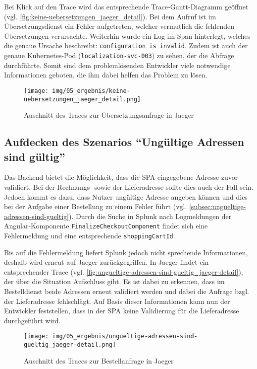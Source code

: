 Bei Klick auf den Trace wird das entsprechende Trace-Gantt-Diagramm geöffnet (vgl. \autoref{fig:keine-uebersetzungen_jaeger_detail}). Bei dem Aufruf ist im Übersetzungsdienst ein Fehler aufgetreten, welcher vermutlich die fehlenden Übersetzungen verursachte. Weiterhin wurde ein Log im Span hinterlegt, welches die genaue Ursache beschreibt: \texttt{configuration is invalid}. Zudem ist auch der genaue Kubernetes-Pod (\texttt{localization-svc-003}) zu sehen, der die Abfrage durchführte. Somit sind dem problemlösenden Entwickler viele notwendige Informationen geboten, die ihm dabei helfen das Problem zu lösen.

\begin{figure}[H]
	\centering
	\texttt{[image: img/05\_ergebnis/keine-uebersetzungen\_jaeger\_detail.png]}
	\caption{Auschnitt des Traces zur Übersetzungsanfrage in Jaeger}
	\label{fig:keine-uebersetzungen_jaeger_detail}
\end{figure}

\subsection{Aufdecken des Szenarios \enquote{Ungültige Adressen sind gültig}}

Das Backend bietet die Möglichkeit, dass die SPA eingegebene Adresse zuvor validiert. Bei der Rechnungs- sowie der Lieferadresse sollte dies auch der Fall sein. Jedoch kommt es dazu, dass Nutzer ungültige Adresse angeben können und dies bei der Aufgabe einer Bestellung zu einem Fehler führt (vgl. \autoref{subsec:ungueltige-adressen-sind-gueltig}). Durch die Suche in Splunk nach Logmeldungen der Angular-Komponente \texttt{Finalize\-Checkout\-Component} findet sich eine Fehlermeldung und eine entsprechende \texttt{shopping\-Cart\-Id}.

Bis auf die Fehlermeldung liefert Splunk jedoch nicht sprechende Informationen, deshalb wird erneut auf Jaeger zurückgegriffen. In Jaeger findet ein entsprechender Trace (vgl. \autoref{fig:ungueltige-adressen-sind-gueltig_jaeger-detail}), der über die Situation Aufschluss gibt. Es ist dabei zu erkennen, dass im Bestelldienst beide Adressen erneut validiert werden und dabei die Anfrage bzgl. der Lieferadresse fehlschlägt. Auf Basis dieser Informationen kann nun der Entwickler feststellen, dass in der SPA keine Validierung für die Lieferadresse durchgeführt wird.

\begin{figure}[H]
	\centering
	\texttt{[image: img/05\_ergebnis/ungueltige-adressen-sind-gueltig\_jaeger-detail.png]}
	\caption{Auschnitt des Traces zur Bestellanfrage in Jaeger}
	\label{fig:ungueltige-adressen-sind-gueltig_jaeger-detail}
\end{figure}

